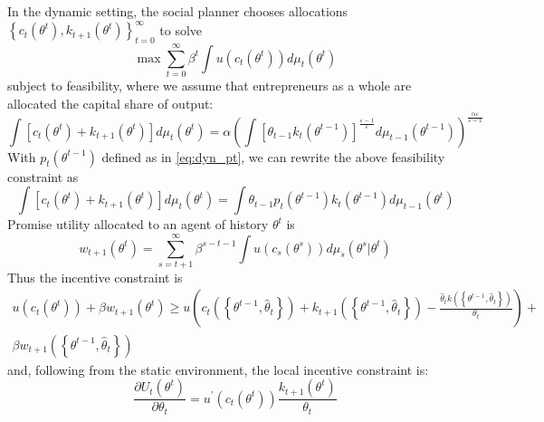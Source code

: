 \documentclass[11pt]{article}
\begin{document}
In the dynamic setting, the social planner chooses allocations $\left\{ c_{t}\left(\theta^{t}\right),k_{t+1}\left(\theta^{t}\right)\right\} _{t=0}^{\infty}$
to solve 
\begin{equation}
\max\sum_{t=0}^{\infty}\beta^{t}\int u\left(c_{t}\left(\theta^{t}\right)\right)d\mu_{t}\left(\theta^{t}\right)\label{eq:dyn_plan}
\end{equation}
subject to feasibility, where we assume that entrepreneurs as a whole are allocated the capital share of output: 
\begin{equation}
\int\left[c_{t}\left(\theta^{t}\right)+k_{t+1}\left(\theta^{t}\right)\right]d\mu_{t}\left(\theta^{t}\right)=\alpha\left(\int\left[\theta_{t-1}k_{t}\left(\theta^{t-1}\right)\right]^{\frac{\varepsilon-1}{\varepsilon}}d\mu_{t-1}\left(\theta^{t-1}\right)\right)^{\frac{\alpha\varepsilon}{\varepsilon-1}}\label{eq:dyn_feas1}
\end{equation}
With $p_{t}\left(\theta^{t-1}\right)$ defined as in \eqref{eq:dyn_pt}, we can rewrite the above feasibility constraint as 
\begin{equation}
\int\left[c_{t}\left(\theta^{t}\right)+k_{t+1}\left(\theta^{t}\right)\right]d\mu_{t}\left(\theta^{t}\right)=\int\theta_{t-1}p_{t}\left(\theta^{t-1}\right)k_{t}\left(\theta^{t-1}\right)d\mu_{t-1}\left(\theta^{t}\right)\label{eq:dyn_feas2}
\end{equation}
Promise utility allocated to an agent of history $\theta^{t}$ is
\begin{equation}
w_{t+1}\left(\theta^{t}\right)=\sum_{s=t+1}^{\infty}\beta^{s-t-1}\int u\left(c_{s}\left(\theta^{s}\right)\right)d\mu_{s}\left(\theta^{s}\big|\theta^{t}\right)
\end{equation}
Thus the incentive constraint is 
\begin{multline}
u\left(c_{t}\left(\theta^{t}\right)\right)+\beta w_{t+1}\left(\theta^{t}\right)\ge u\left(c_{t}\left(\left\{ \theta^{t-1},\hat{\theta}_{t}\right\} \right)+k_{t+1}\left(\left\{ \theta^{t-1},\hat{\theta}_{t}\right\} \right)-\frac{\hat{\theta}_{t}k\left(\left\{ \theta^{t-1},\hat{\theta}_{t}\right\} \right)}{\theta_{t}}\right)+\\
\beta w_{t+1}\left(\left\{ \theta^{t-1},\hat{\theta}_{t}\right\} \right)
\end{multline}
and, following from the static environment, the local incentive constraint is: 
\begin{equation}
\frac{\partial U_t \left( \theta^t \right)}{\partial \theta_t}=u^{\prime}\left(c_{t}\left(\theta^{t}\right)\right)\frac{k_{t+1}\left(\theta^{t}\right)}{\theta_{t}}\label{eq:dyn_ic}
\end{equation}
\end{document}
